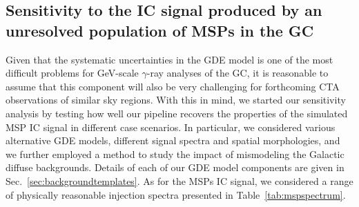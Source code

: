 \documentclass[doublespace,nopageskip]{VTthesis} %
\begin{document}
\subsection{Sensitivity to the IC signal produced by an unresolved population of MSPs in the GC}
\label{subsec:sensitivityICMSPs}

Given that the systematic uncertainties in the GDE model is one of the most difficult problems for GeV-scale $\gamma$-ray analyses of the GC, it is reasonable to assume that this component will also be very challenging for forthcoming CTA observations of similar sky regions. With this in mind, we started our sensitivity analysis by testing how well our pipeline recovers the properties of the simulated MSP IC signal in different case scenarios. In particular, we considered various alternative GDE models, different signal spectra and spatial morphologies, and we further employed a method to study the impact of mismodeling the Galactic diffuse backgrounds. Details of each of our GDE model components are given in Sec.~\ref{sec:backgroundtemplates}. As for the MSPs IC signal, we considered a range of physically reasonable injection spectra presented in Table~\ref{tab:mspspectrum}.
\end{document}
